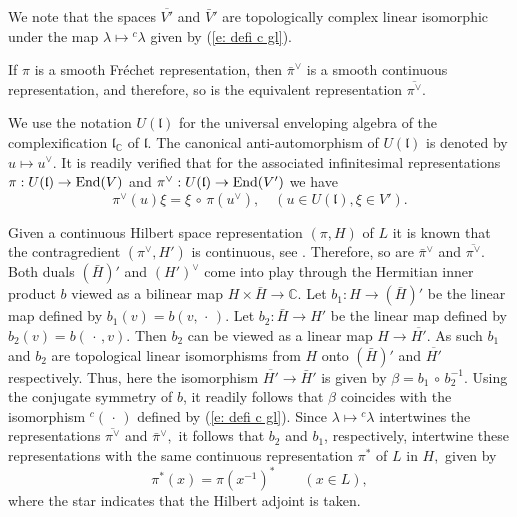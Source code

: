 \documentclass[12pt,a4paper]{article}
\def\qquad{\quad\quad}
\def\msy#1{{\mathbb #1}}
\def\C{{\msy C}}
\def\gb{\beta}
\def\gl{\lambda}
\def\got#1{\mathfrak #1}
\def\fl{{\got l}}
\def\to{\rightarrow}
\def\End{{\rm End}}
\def\after{\,{\scriptstyle\circ}\,}
\def\iC{{\scriptscriptstyle \C}}
\numberwithin{Thm}{section}
\numberwithin{equation}{section}
\def\dotvar{\, \cdot\,}
\numberwithin{equation}{section}
\def\veec{\vee}%
\begin{document}
We note that the spaces $\overline{V'}$ and  $\bar V '$ are
topologically complex linear isomorphic under the map $\gl \mapsto {}^c\! \gl$ given 
by (\ref{e: defi c gl}).

If $\pi$ is a smooth Fr\'echet representation, then $\bar \pi^\veec$ is a smooth continuous representation, and therefore, so is the equivalent representation $\overline{\pi^\veec}.$ 

We use the notation $U(\fl)$ for the universal enveloping algebra of the complexification
$\fl_\iC$ of $\fl.$ The canonical anti-automorphism of $U(\fl)$ is denoted by $u \mapsto u^\veec.$
 It is readily verified that for the associated infinitesimal representations
$\pi: U(\fl) \to \End(V)$ and $\pi^\veec: U(\fl) \to \End(V')$ we have
$$ 
\pi^\veec (u) \xi = \xi \after \pi(u^\veec), \quad (u \in U(\fl), \xi \in V').
$$%
 

Given a continuous Hilbert space representation $(\pi, H)$ of $L$ 
it is known that the contragredient $(\pi^\veec,H')$
is continuous, see \cite[Cor. 4.1.2.3]{Warn1}. 
Therefore, so are $\bar\pi^\veec$ and $\overline{\pi^\veec}.$ Both duals 
$(\bar H)'$ and $(H')^\veec$ come into play through the Hermitian
 inner product $b$ viewed as a  bilinear map $H \times \bar H \to \C.$ 
Let $b_1: H \to (\bar H)'$ be the linear map defined by $b_1(v)= b(v, \dotvar).$ 
Let $b_2: \bar H \to H'$ be the linear map defined by $b_2(v) = b(\dotvar, v).$ 
Then $b_2$ can be viewed as a linear map $H \to \overline{H'}.$ 
As such $b_1$ and $b_2$ are topological linear isomorphisms
from $H$ onto $(\bar H)'$ and $\overline{H'}$ respectively. 
Thus, here the isomorphism  $\overline{H'} \to \bar H'$ is given by $\gb= b_1\after b_2^{-1}.$ 
Using the conjugate symmetry of $b$, it readily follows that $\gb$ coincides with the 
isomorphism ${}^c(\dotvar)$ defined by (\ref{e: defi c gl}). Since $\gl \mapsto {}^c\! \gl$ 
intertwines the representations $\overline{\pi^\veec }$ and $\bar \pi^\veec,$ 
it follows that $b_2$ and $b_1$, respectively, intertwine these
representations with the same continuous representation $\pi^*$ of $L$ in $H,$ given by 
$$ 
\pi^*(x) = \pi(x^{-1})^* \qquad (x \in L),
$$ 
where the star indicates that the Hilbert adjoint is taken.
\end{document}
